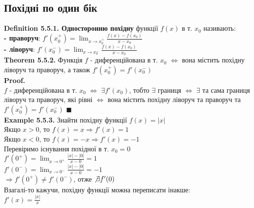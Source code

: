 \documentclass[a4paper, 14pt]{extarticle}
\def\huge{\displaystyle}
\def\bigline{\vspace{5mm}\\}
\def\defin#1{\textbf{Definition {#1}}}
\def\ex#1{\textbf{Example {#1}}}
\def\th#1{\textbf{Theorem {#1}}}
\def\proof{\textbf{Proof.}\\}
\def\bigline{\vspace{5mm}\\}
\def\qed{$\blacksquare$}
\begin{document}
\subsection{Похідні по один бік}
\defin{5.5.1. Односторонню похідну} функції $f(x)$ в т. $x_0$ називають:\\
\textbf{- праворуч}: $\huge f'(x_0^+) = \lim_{x \to x_0^+} \frac{f(x)-f(x_0)}{x-x_0}$\\
\textbf{- ліворуч}: $\huge f'(x_0^-) = \lim_{x \to x_0^-} \frac{f(x)-f(x_0)}{x-x_0}$
\bigline
\th{5.5.2.} Функція $f$ - диференційована в т. $x_0$ $\iff$ вона містить похідну ліворуч та праворуч, а також $f'(x_0^+) = f'(x_0^-)$\\
\proof
$f$ - диференційована в т. $x_0$ $\iff$ $\exists f'(x_0)$, тобто $\exists$ границя $\iff$ $\exists$ та сама границя ліворуч та праворуч, які рівні $\iff$ вона містить похідну ліворуч та праворуч та $f'(x_0^+) = f'(x_0^-)$ \qed
\bigline
\ex{5.5.3.} Знайти похідну функції $f(x) = |x|$\\
Якщо $x>0$, то $f(x) = x \Rightarrow f'(x) = 1$\\
Якщо $x<0$, то $f(x) = -x \Rightarrow f'(x) = -1$\\
Перевіримо існування похідної в т. $x_0 = 0$\\
$f'(0^+) = \huge \lim_{x \to 0^+} \frac{|x|-|0|}{x-0} = 1$\\
$f'(0^-) = \huge \lim_{x \to 0^-} \frac{|x|-|0|}{x-0} = -1$\\
$\Rightarrow f'(0^+) \neq f'(0^-)$, отже $\not \exists f'(0)$\\
Взагалі-то кажучи, похідну функції можна переписати інакше:\\
$f'(x) = \huge \frac{|x|}{x}$
\bigline
\end{document}
